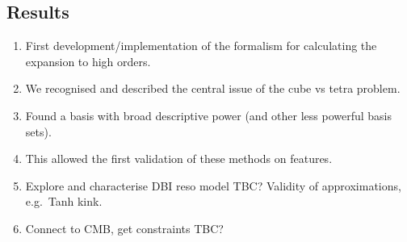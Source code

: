     \subsection{Results}
    \begin{enumerate}
        \item First development/implementation of the formalism for calculating the expansion to high orders.
        \item We recognised and described the central issue of the cube vs tetra problem.
        \item Found a basis with broad descriptive power (and other less powerful basis sets).
        \item This allowed the first validation of these methods on features.
        \item Explore and characterise DBI reso model TBC? Validity of approximations, e.g.\ Tanh kink.
        \item Connect to CMB, get constraints TBC?
    \end{enumerate}
